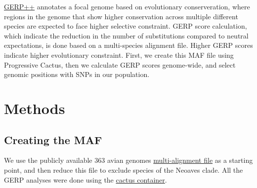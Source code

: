 \documentclass[
  letterpaper,
  DIV=11,
  numbers=noendperiod]{scrreprt}
\begin{document}
\href{https://bio.tools/gerp}{GERP++} annotates a focal genome based on
evolutionary conserveration, where regions in the genome that show
higher conservation across multiple different species are expected to
face higher selective constraint. GERP score calculation, which indicate
the reduction in the number of substitutions compared to neutral
expectations, is done based on a multi-species alignment file. Higher
GERP scores indicate higher evolutionary constraint. First, we create
this MAF file using Progressive Cactus, then we calculate GERP scores
genome-wide, and select genomic positions with SNPs in our population.

\hypertarget{methods-1}{%
\section{Methods}\label{methods-1}}

\hypertarget{creating-the-maf}{%
\subsection{Creating the MAF}\label{creating-the-maf}}

We use the publicly available 363 avian genomes
\href{https://cgl.gi.ucsc.edu/data/cactus/363-avian-2020.hal}{multi-alignment
file} as a starting point, and then reduce this file to exclude species
of the Neoaves clade. All the GERP analyses were done using the
\href{https://quay.io/repository/comparative-genomics-toolkit/cactus}{cactus
container}.
\end{document}
